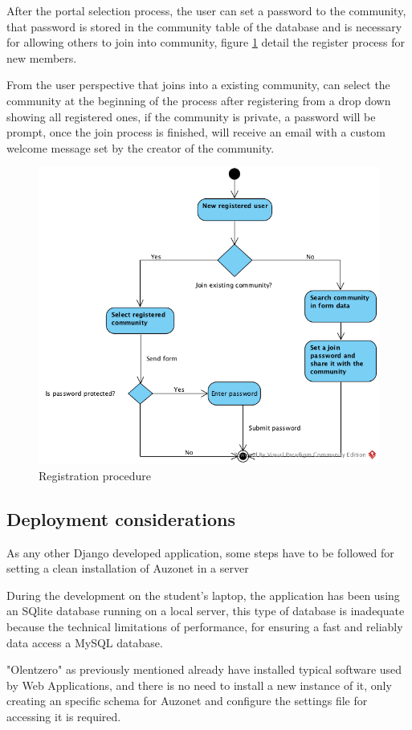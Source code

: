 \documentclass{DeustoFDP}
\begin{document}
After the portal selection process, the user can set a password to the community, that password is stored in the community table of the database and is necessary for allowing others to join into community, figure \ref{fig:Registerflow} detail the register process for new members.

From the user perspective that joins into a existing community, can select the community at the beginning of the process after registering from a drop down showing all registered ones, if the community is private, a password will be prompt, once the join process is finished, will receive an email with a custom welcome message set by the creator of the community.

\begin{figure}[h]
\centering
\includegraphics[width=0.7\linewidth]{fig/Registerflow}
\caption[Registration procedure]{Registration procedure}
\label{fig:Registerflow}
\end{figure}

\subsection{Deployment considerations}
As any other Django developed application, some steps have to be followed for setting a clean installation of Auzonet in a server

During the development on the student's laptop, the application has been using an SQlite database running on a local server, this type of database is inadequate because the technical limitations of performance, for ensuring a fast and reliably data access a MySQL database. 

"Olentzero" as previously mentioned already have installed typical software used by Web Applications, and there is no need to install a new instance of it, only creating an specific schema for Auzonet and configure the settings file for accessing it is required. 
\end{document}
